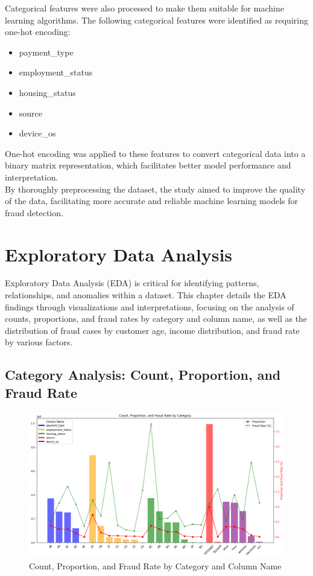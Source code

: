 \documentclass[12pt,a4paper]{report}
\begin{document}
Categorical features were also processed to make them suitable for machine learning algorithms. The following categorical features were identified as requiring one-hot encoding:
\begin{itemize}
    \item payment\_type
    \item employment\_status
    \item housing\_status
    \item source
    \item device\_os
\end{itemize}
One-hot encoding was applied to these features to convert categorical data into a binary matrix representation, which facilitates better model performance and interpretation.\\

By thoroughly preprocessing the dataset, the study aimed to improve the quality of the data, facilitating more accurate and reliable machine learning models for fraud detection.\\






\chapter{Exploratory Data Analysis}

Exploratory Data Analysis (EDA) is critical for identifying patterns, relationships, and anomalies within a dataset. This chapter details the EDA findings through visualizations and interpretations, focusing on the analysis of counts, proportions, and fraud rates by category and column name, as well as the distribution of fraud cases by customer age, income distribution, and fraud rate by various factors.

\section{Category Analysis: Count, Proportion, and Fraud Rate}

\begin{figure}[h]
    \centering
    \includegraphics[width=\textwidth]{Count_Proportion_and_Fraud_Rate_by_Category.png}
    \caption{Count, Proportion, and Fraud Rate by Category and Column Name}
    \label{fig:count_proportion_fraud_rate}
\end{figure}
\end{document}

